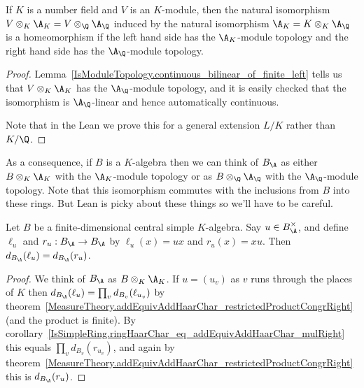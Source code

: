 \begin{corollary}
  \label{NumberField.AdeleRing.ModuleBaseChangeContinuousAddEquiv}
  \leanok
  If $K$ is a number field and $V$ is an $K$-module, then
  the natural isomorphism $V\otimes_K\A_K=V\otimes_{\Q}\A_{\Q}$ induced by the natural
  isomorphism $\A_K=K\otimes_K\A_{\Q}$ is a homeomorphism if the left hand side has the $\A_K$-module
  topology and the right hand side has the $\A_{\Q}$-module topology.
\end{corollary}
\begin{proof}
  Lemma~\ref{IsModuleTopology.continuous_bilinear_of_finite_left} tells us that $V\otimes_K\A_K$
  has the $\A_{\Q}$-module topology, and it is easily checked that the isomorphism is
  $\A_{\Q}$-linear and hence automatically continuous.

  Note that in the Lean we prove this for a general extension $L/K$ rather than $K/\Q$.
\end{proof}

As a consequence, if $B$ is a $K$-algebra then we can think of $B_{\A}$ as either $B\otimes_K\A_K$
with the $\A_K$-module topology or as $B\otimes_{\Q}\A_{\Q}$ with the $\A_{\Q}$-module
topology. Note that this isomorphism commutes with the inclusions from $B$ into these rings.
But Lean is picky about these things so we'll have to be careful.

\begin{theorem}
  \label{NumberField.AdeleRing.isCentralSimple_addHaarScalarFactor_left_mul_eq_right_mul}
  \leanok
  Let $B$ be a finite-dimensional central simple $K$-algebra.
  Say $u\in B_{\A}^\times$, and define $\ell_u$ and $r_u:B_{\A}\to B_{\A}$ by
  $\ell_u(x)=ux$ and $r_u(x)=xu$. Then $d_{B_{\A}}(\ell_u)=d_{B_{\A}}(r_u)$.
\end{theorem}
\begin{proof}
  We think of $B_{\A}$ as $B\otimes_K\A_K$.
  If $u=(u_v)$ as $v$ runs through the places of $K$ then
  $d_{B_{\A}}(\ell_u)=\prod_v d_{B_v}(\ell_{u_v})$ by
  theorem~\ref{MeasureTheory.addEquivAddHaarChar_restrictedProductCongrRight} (and the product is finite).
  By corollary~\ref{IsSimpleRing.ringHaarChar_eq_addEquivAddHaarChar_mulRight}
  this equals $\prod_v d_{B_v}(r_{u_v})$, and again by
  theorem~\ref{MeasureTheory.addEquivAddHaarChar_restrictedProductCongrRight} this is $d_{B_{\A}}(r_u)$.
\end{proof}

